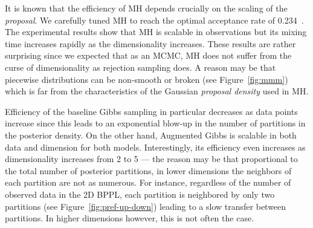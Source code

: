 It is known that the efficiency of MH depends crucially on the scaling
of the \emph{proposal}.  We carefully tuned MH to reach the optimal
acceptance rate of 0.234~\cite{Roberts:97}.  The experimental results
show that MH is scalable in observations but its mixing time increases
rapidly as the dimensionality increases.  These results are rather
surprising since we expected that as an MCMC, MH does not suffer from
the curse of dimensionality as rejection sampling does.  A reason may
be that piecewise distributions can be non-smooth or broken (see
Figure~\ref{fig:mmm}) which is far from the characteristics of the
Gaussian \emph{proposal density} used in MH.

Efficiency of the baseline Gibbs sampling in particular decreases as data points increase since
this leads to an exponential blow-up in the number of partitions in the posterior density.
On the other hand, Augmented Gibbs is scalable in both data 
and dimension for both models. 
Interestingly, its efficiency even increases as dimensionality increases from 2 to 5 ---
the reason may be that proportional to the total number of posterior partitions, in lower dimensions the neighbors of each partition are not as numerous. 
For instance, regardless of the number of observed data in the 2D BPPL, each partition is neighbored by only two partitions (see Figure~\ref{fig:pref-up-down}) leading to a slow transfer between partitions. 
In higher dimensions however, this is not often the case.

